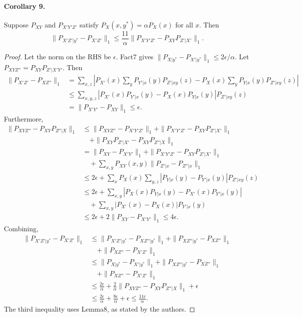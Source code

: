 \paragraph{Corollary 9.} Suppose $P_{XY}$ and $P_{X'Y'Z'}$ satisfy $P_X(x,y^*)=\alpha P_X(x)$ for all $x$. Then
\[\|P_{X'Z'|y^*}-P_{X'Z'}\|_1\le\frac{11}\alpha\|P_{X'Y'Z'}-P_{XY}P_{Z'|X'}\|_1.\]
\begin{proof}Let the norm on the RHS be $\epsilon$. Fact7 gives $\|P_{X|y^*}-P_{X'|y^*}\|_1\le2\epsilon/\alpha$. Let $P_{XYZ''}=P_{XY}P_{Z'|X'Y'}$. Then
\begin{align*}\|P_{X'Z'}-P_{XZ''}\|_1&=\sum_{x,z}\left|P_{X'}(x)\sum_yP_{Y'|x}(y)P_{Z'|xy}(z)-P_X(x)\sum_yP_{Y|x}(y)P_{Z'|xy}(z)\right|\\&\le\sum_{x,y,z}|P_{X'}(x)P_{Y'|x}(y)-P_X(x)P_{Y|x}(y)|P_{Z'|xy}(z)\\&=\|P_{X'Y'}-P_{XY}\|_1\le\epsilon.
\end{align*}
Furthermore,
\begin{align*}\|P_{XYZ''}-P_{XY}P_{Z''|X}\|_1&\le\|P_{XYZ''}-P_{X'Y'Z'}\|_1+\|P_{X'Y'Z'}-P_{XY}P_{Z'|X'}\|_1\\&\quad+\|P_{XY}P_{Z'|X'}-P_{XY}P_{Z''|X}\|_1\\&=\|P_{XY}-P_{X'Y'}\|_1+\|P_{X'Y'Z'}-P_{XY}P_{Z'|X'}\|_1\\&\quad+\sum_{x,y}P_{XY}(x,y)\|P_{Z'|x}-P_{Z''|x}\|_1\\&\le2\epsilon+\sum_xP_X(x)\sum_{y,z}|P_{Y|x}(y)-P_{Y'|x}(y)|P_{Z'|xy}(z)\\&\le2\epsilon+\sum_{x,y}|P_X(x)P_{Y|x}(y)-P_{X'}(x)P_{Y'|x}(y)|\\&\quad+\sum_{x,y}|P_{X'}(x)-P_X(x)|P_{Y'|x}(y)\\&\le2\epsilon+2\|P_{XY}-P_{X'Y'}\|_1\le4\epsilon.
\end{align*}
Combining,
\begin{align*}\|P_{X'Z'|y^*}-P_{X'Z'}\|_1&\le\|P_{X'Z'|y^*}-P_{XZ''|y^*}\|_1+\|P_{XZ''|y^*}-P_{XZ''}\|_1\\&\quad+\|P_{XZ''}-P_{X'Z'}\|_1\\&\le\|P_{X|y^*}-P_{X'|y^*}\|_1+\|P_{XZ''|y^*}-P_{XZ''}\|_1\\&\quad+\|P_{XZ''}-P_{X'Z'}\|_1\\&\le\frac{2\epsilon}\alpha+\frac2\alpha\|P_{XYZ''}-P_{XY}P_{Z''|X}\|_1+\epsilon\\&\le\frac{2\epsilon}\alpha+\frac{8\epsilon}\alpha+\epsilon\le\frac{11\epsilon}\alpha.
\end{align*}
The third inequality uses Lemma8, as stated by the authors.\end{proof}
